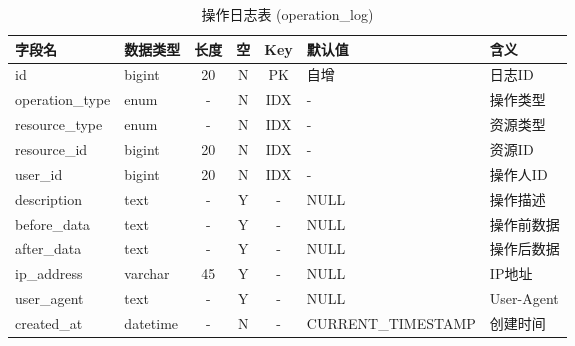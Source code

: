\documentclass[UTF8,a4paper,12pt]{article}
\begin{document}
\begin{table}[H]
    \centering
    \caption{操作日志表 (operation\_log)}
    \label{tab:operation_log}
    \small
    \renewcommand{\arraystretch}{1.3}
    \begin{tabular}{|l|l|c|c|c|l|l|}
        \hline
        \rowcolor{gray!15} \textbf{字段名} & \textbf{数据类型} & \textbf{长度} & \textbf{空} & \textbf{Key} & \textbf{默认值} & \textbf{含义} \\ \hline
        id & bigint & 20 & N & PK & 自增 & 日志ID \\ \hline
        operation\_type & enum & - & N & IDX & - & 操作类型 \\ \hline
        resource\_type & enum & - & N & IDX & - & 资源类型 \\ \hline
        resource\_id & bigint & 20 & N & IDX & - & 资源ID \\ \hline
        user\_id & bigint & 20 & N & IDX & - & 操作人ID \\ \hline
        description & text & - & Y & - & NULL & 操作描述 \\ \hline
        before\_data & text & - & Y & - & NULL & 操作前数据 \\ \hline
        after\_data & text & - & Y & - & NULL & 操作后数据 \\ \hline
        ip\_address & varchar & 45 & Y & - & NULL & IP地址 \\ \hline
        user\_agent & text & - & Y & - & NULL & User-Agent \\ \hline
        created\_at & datetime & - & N & - & CURRENT\_TIMESTAMP & 创建时间 \\ \hline
    \end{tabular}
\end{table}
\end{document}
